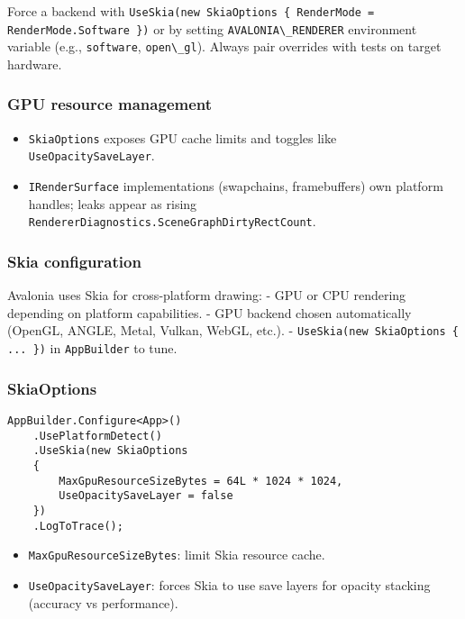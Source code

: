 Force a backend with
\passthrough{\lstinline!UseSkia(new SkiaOptions \{ RenderMode = RenderMode.Software \})!}
or by setting \passthrough{\lstinline!AVALONIA\_RENDERER!} environment
variable (e.g., \passthrough{\lstinline!software!},
\passthrough{\lstinline!open\_gl!}). Always pair overrides with tests on
target hardware.

\subsubsection{GPU resource management}\label{gpu-resource-management}

\begin{itemize}
\tightlist
\item
  \passthrough{\lstinline!SkiaOptions!} exposes GPU cache limits and
  toggles like \passthrough{\lstinline!UseOpacitySaveLayer!}.
\item
  \passthrough{\lstinline!IRenderSurface!} implementations (swapchains,
  framebuffers) own platform handles; leaks appear as rising
  \passthrough{\lstinline!RendererDiagnostics.SceneGraphDirtyRectCount!}.
\end{itemize}

\subsubsection{Skia configuration}\label{skia-configuration}

Avalonia uses Skia for cross-platform drawing: - GPU or CPU rendering
depending on platform capabilities. - GPU backend chosen automatically
(OpenGL, ANGLE, Metal, Vulkan, WebGL, etc.). -
\passthrough{\lstinline!UseSkia(new SkiaOptions \{ ... \})!} in
\passthrough{\lstinline!AppBuilder!} to tune.

\subsubsection{SkiaOptions}\label{skiaoptions}

\begin{lstlisting}
AppBuilder.Configure<App>()
    .UsePlatformDetect()
    .UseSkia(new SkiaOptions
    {
        MaxGpuResourceSizeBytes = 64L * 1024 * 1024,
        UseOpacitySaveLayer = false
    })
    .LogToTrace();
\end{lstlisting}

\begin{itemize}
\tightlist
\item
  \passthrough{\lstinline!MaxGpuResourceSizeBytes!}: limit Skia resource
  cache.
\item
  \passthrough{\lstinline!UseOpacitySaveLayer!}: forces Skia to use save
  layers for opacity stacking (accuracy vs performance).
\end{itemize}

